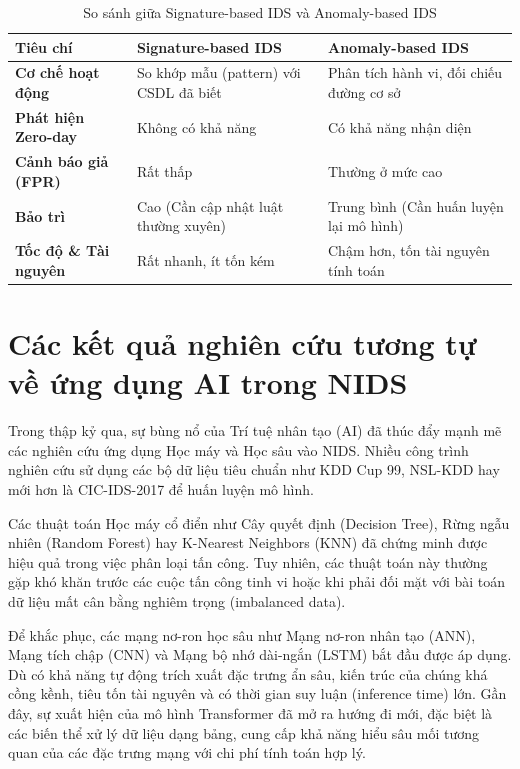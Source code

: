 \documentclass[../DoAn.tex]{subfiles}
\begin{document}
\begin{table}[htbp]
\centering
\caption{So sánh giữa Signature-based IDS và Anomaly-based IDS}
\label{tab:ids_comparison}
\begin{tabular}{|p{3.5cm}|p{5.5cm}|p{5.5cm}|}
\hline
\textbf{Tiêu chí} & \textbf{Signature-based IDS} & \textbf{Anomaly-based IDS} \\
\hline
\textbf{Cơ chế hoạt động} & So khớp mẫu (pattern) với CSDL đã biết & Phân tích hành vi, đối chiếu đường cơ sở \\
\hline
\textbf{Phát hiện Zero-day} & Không có khả năng & Có khả năng nhận diện \\
\hline
\textbf{Cảnh báo giả (FPR)} & Rất thấp & Thường ở mức cao \\
\hline
\textbf{Bảo trì} & Cao (Cần cập nhật luật thường xuyên) & Trung bình (Cần huấn luyện lại mô hình) \\
\hline
\textbf{Tốc độ \& Tài nguyên} & Rất nhanh, ít tốn kém & Chậm hơn, tốn tài nguyên tính toán \\
\hline
\end{tabular}
\end{table}

\section{Các kết quả nghiên cứu tương tự về ứng dụng AI trong NIDS}
Trong thập kỷ qua, sự bùng nổ của Trí tuệ nhân tạo (AI) đã thúc đẩy mạnh mẽ các nghiên cứu ứng dụng Học máy và Học sâu vào NIDS. Nhiều công trình nghiên cứu sử dụng các bộ dữ liệu tiêu chuẩn như KDD Cup 99, NSL-KDD hay mới hơn là CIC-IDS-2017 để huấn luyện mô hình.

Các thuật toán Học máy cổ điển như Cây quyết định (Decision Tree), Rừng ngẫu nhiên (Random Forest) hay K-Nearest Neighbors (KNN) đã chứng minh được hiệu quả trong việc phân loại tấn công. Tuy nhiên, các thuật toán này thường gặp khó khăn trước các cuộc tấn công tinh vi hoặc khi phải đối mặt với bài toán dữ liệu mất cân bằng nghiêm trọng (imbalanced data).

Để khắc phục, các mạng nơ-ron học sâu như Mạng nơ-ron nhân tạo (ANN), Mạng tích chập (CNN) và Mạng bộ nhớ dài-ngắn (LSTM) bắt đầu được áp dụng. Dù có khả năng tự động trích xuất đặc trưng ẩn sâu, kiến trúc của chúng khá cồng kềnh, tiêu tốn tài nguyên và có thời gian suy luận (inference time) lớn. Gần đây, sự xuất hiện của mô hình Transformer đã mở ra hướng đi mới, đặc biệt là các biến thể xử lý dữ liệu dạng bảng, cung cấp khả năng hiểu sâu mối tương quan của các đặc trưng mạng với chi phí tính toán hợp lý.
\end{document}
